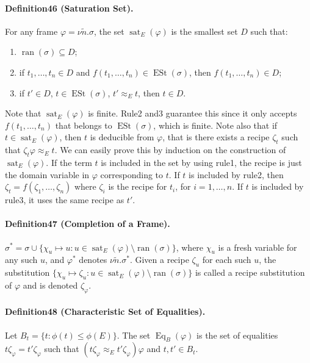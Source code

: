 \paragraph{Definition46 (Saturation Set).} For any frame $\varphi=\nu\tilde n.\sigma$, the set $\operatorname{sat}_E(\varphi)$ is the smallest set $D$ such that:
\begin{enumerate}
\item $\operatorname{ran}(\sigma)\subseteq D$;
\item if $t_1,\ldots,t_n\in D$ and $f(t_1,\ldots,t_n)\in\operatorname{ESt}(\sigma)$, then $f(t_1,\ldots,t_n)\in D$;
\item if $t'\in D$, $t\in\operatorname{ESt}(\sigma)$, $t'\approx_Et$, then $t\in D$.
\end{enumerate}
Note that $\operatorname{sat}_E(\varphi)$ is finite. Rule2 and3 guarantee this since it only accepts $f(t_1,\ldots,t_n)$ that belongs to $\operatorname{ESt}(\sigma)$, which is finite.
Note also that if $t\in\operatorname{sat}_E(\varphi)$, then $t$ is deducible from $\varphi$, that is there exists a recipe $\zeta_t$ such that $\zeta_t\varphi\approx_Et$. We can easily prove this by induction on the construction of $\operatorname{sat}_E(\varphi)$.
If the term $t$ is included in the set by using rule1, the recipe is just the domain variable in $\varphi$ corresponding to $t$.
If $t$ is included by rule2, then $\zeta_t=f(\zeta_1,\ldots,\zeta_n)$ where $\zeta_i$ is the recipe for $t_i$, for $i=1,\ldots,n$.
If $t$ is included by rule3, it uses the same recipe as $t'$.
\paragraph{Definition47 (Completion of a Frame).} $\sigma^*=\sigma\cup\{\chi_u\mapsto u:u\in\operatorname{sat}_E(\varphi)\setminus\operatorname{ran}(\sigma)\}$, where $\chi_u$ is a fresh variable for any such $u$, and $\varphi^*$ denotes $\nu\tilde n.\sigma^*$.
Given a recipe $\zeta_u$ for each such $u$, the substitution $\{\chi_u\mapsto\zeta_u:u\in\operatorname{sat}_E(\varphi)\setminus\operatorname{ran}(\sigma)\}$ is called a recipe substitution of $\varphi$ and is denoted $\zeta_\varphi$.
\paragraph{Definition48 (Characteristic Set of Equalities).} Let $B_t=\{t:\phi(t)\le\phi(E)\}$. The set $\operatorname{Eq}_B(\varphi)$ is the set of equalities $t\zeta_\varphi=t'\zeta_\varphi$ such that $(t\zeta_\varphi\approx_Et'\zeta_\varphi)\varphi$ and $t,t'\in B_t$.
